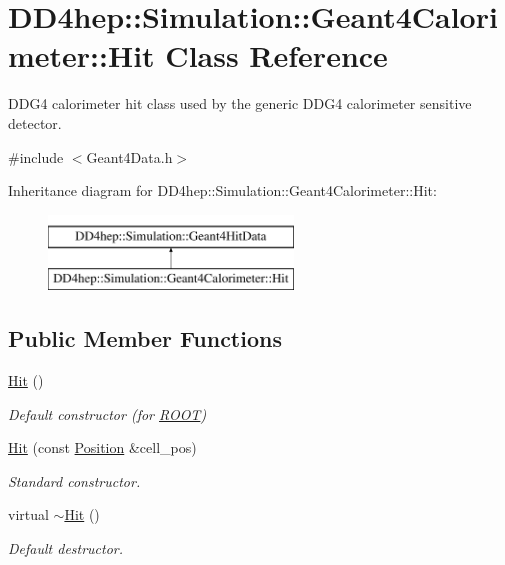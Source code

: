 \hypertarget{class_d_d4hep_1_1_simulation_1_1_geant4_calorimeter_1_1_hit}{}\section{D\+D4hep\+:\+:Simulation\+:\+:Geant4\+Calorimeter\+:\+:Hit Class Reference}
\label{class_d_d4hep_1_1_simulation_1_1_geant4_calorimeter_1_1_hit}


D\+D\+G4 calorimeter hit class used by the generic D\+D\+G4 calorimeter sensitive detector.  




{\ttfamily \#include $<$Geant4\+Data.\+h$>$}

Inheritance diagram for D\+D4hep\+:\+:Simulation\+:\+:Geant4\+Calorimeter\+:\+:Hit\+:\begin{figure}[H]
\begin{center}
\leavevmode
\includegraphics[height=2.000000cm]{class_d_d4hep_1_1_simulation_1_1_geant4_calorimeter_1_1_hit}
\end{center}
\end{figure}
\subsection*{Public Member Functions}
\begin{DoxyCompactItemize}
\item 
\hyperlink{class_d_d4hep_1_1_simulation_1_1_geant4_calorimeter_1_1_hit_aa82fe18c0b10841fcba68e73c2efd0b0}{Hit} ()
\begin{DoxyCompactList}\small\item\em Default constructor (for \hyperlink{namespace_r_o_o_t}{R\+O\+OT}) \end{DoxyCompactList}\item 
\hyperlink{class_d_d4hep_1_1_simulation_1_1_geant4_calorimeter_1_1_hit_ac32b075818d49af9ee0a119877c68980}{Hit} (const \hyperlink{namespace_d_d4hep_1_1_geometry_a55083902099d03506c6db01b80404900}{Position} \&cell\+\_\+pos)
\begin{DoxyCompactList}\small\item\em Standard constructor. \end{DoxyCompactList}\item 
virtual \hyperlink{class_d_d4hep_1_1_simulation_1_1_geant4_calorimeter_1_1_hit_a57de79fef476cc5fb8564e1b712d0aad}{$\sim$\+Hit} ()
\begin{DoxyCompactList}\small\item\em Default destructor. \end{DoxyCompactList}\end{DoxyCompactItemize}
